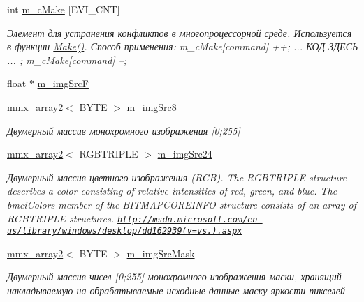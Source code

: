 \begin{DoxyCompactItemize}
int \hyperlink{class_c_v_i_engine_base_a2c62f336b24d613e0320d2e6f676b89b}{m\+\_\+c\+Make} \mbox{[}E\+V\+I\+\_\+\+C\+N\+T\mbox{]}
\begin{DoxyCompactList}\small\item\em Элемент для устранения конфликтов в многопроцессорной среде. Используется в функции \hyperlink{class_c_v_i_engine_base_aa59b55fc315394f4c19cb7d95c399913}{Make()}. Способ применения\+: m\+\_\+c\+Make\mbox{[}command\mbox{]} ++; ... КОД ЗДЕСЬ ... ; m\+\_\+c\+Make\mbox{[}command\mbox{]} --; \end{DoxyCompactList}\item 
float $\ast$ \hyperlink{class_c_v_i_engine_base_a359f07597366b8c81727c32c9ff931be}{m\+\_\+img\+Src\+F}
\item 
\hyperlink{classmmx__array2}{mmx\+\_\+array2}$<$ B\+Y\+T\+E $>$ \hyperlink{class_c_v_i_engine_base_aa935595a167539c89a4d06a57178d776}{m\+\_\+img\+Src8}
\begin{DoxyCompactList}\small\item\em Двумерный массив монохромного изображения \mbox{[}0;255\mbox{]} \end{DoxyCompactList}\item 
\hyperlink{classmmx__array2}{mmx\+\_\+array2}$<$ R\+G\+B\+T\+R\+I\+P\+L\+E $>$ \hyperlink{class_c_v_i_engine_base_a252e6e1285e6063718c7d7a874298363}{m\+\_\+img\+Src24}
\begin{DoxyCompactList}\small\item\em Двумерный массив цветного изображения (R\+G\+B). The R\+G\+B\+T\+R\+I\+P\+L\+E structure describes a color consisting of relative intensities of red, green, and blue. The bmci\+Colors member of the B\+I\+T\+M\+A\+P\+C\+O\+R\+E\+I\+N\+F\+O structure consists of an array of R\+G\+B\+T\+R\+I\+P\+L\+E structures. \href{http://msdn.microsoft.com/en-us/library/windows/desktop/dd162939(v=vs.85).aspx}{\tt http\+://msdn.\+microsoft.\+com/en-\/us/library/windows/desktop/dd162939(v=vs.).\+aspx} \end{DoxyCompactList}\item 
\hyperlink{classmmx__array2}{mmx\+\_\+array2}$<$ B\+Y\+T\+E $>$ \hyperlink{class_c_v_i_engine_base_a879bfc4065da678c4ca67ed828b05a05}{m\+\_\+img\+Src\+Mask}
\begin{DoxyCompactList}\small\item\em Двумерный массив чисел \mbox{[}0;255\mbox{]} монохромного изображения-\/маски, хранящий накладываемую на обрабатываемые исходные данные маску яркости пикселей \end{DoxyCompactList}\item 

\end{DoxyCompactItemize}
